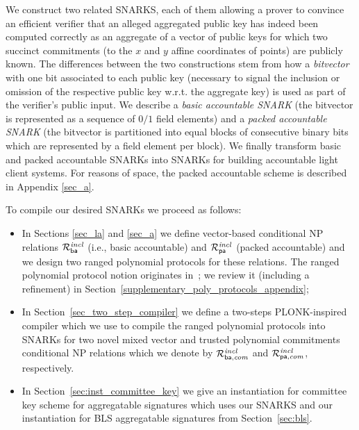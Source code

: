 \label{sec:snarks}

We construct two related SNARKS, each of them allowing a prover to convince an 
efficient verifier that an alleged aggregated public key has indeed been computed correctly as an aggregate 
of a vector of public keys for which two succinct commitments (to the $x$ and $y$ affine coordinates of points) are publicly known. The differences between the two  
constructions stem from how a \emph{bitvector} with one bit associated to each public key 
(necessary to signal the inclusion or omission of the respective public key w.r.t. the aggregate key) 
is used as part of the verifier's public input. We describe a 
\emph{basic accountable SNARK} (the bitvector is represented as a sequence of $0/1$ field elements) and a \emph{packed accountable SNARK} (the bitvector is 
partitioned into equal blocks of consecutive binary bits which are represented by a field element per block). 
We finally transform basic and packed accountable SNARKs into SNARKs for building accountable light client systems. For reasons of space, the packed accountable scheme is described in Appendix \ref{sec_a}.

\noindent To compile our desired SNARKs we proceed as follows:
\begin{itemize}
\item In Sections \ref{sec_la} and \ref{sec_a} we define vector-based conditional NP relations $\mathcal{R}^{\mathit{incl}}_{\mathsf{ba}}$ (i.e., basic accountable) and $\mathcal{R}^{\mathit{incl}}_{\mathsf{pa}}$ (packed accountable) and we design two ranged polynomial protocols for these relations. The ranged polynomial protocol notion originates in~\cite{plonk}; 
we review it (including a refinement) in Section~\ref{supplementary_poly_protocols_appendix};  
\item In Section~\ref{sec_two_step_compiler} we define a two-steps PLONK-inspired compiler which we use to compile the ranged polynomial protocols into 
SNARKs for two novel mixed vector and trusted polynomial commitments conditional NP relations which we denote by 
$\mathcal{R}^{\mathit{incl}}_{\mathsf{ba},\mathit{com}}$ and $\mathcal{R}^{\mathit{incl}}_{\mathsf{pa},\mathit{com}}$, respectively. 
\item In Section~\ref{sec:inst_committee_key} we give an instantiation for committee key scheme for aggregatable signatures which uses our SNARKS 
 and our instantiation for BLS aggregatable signatures from Section~\ref{sec:bls}. 
\end{itemize}

